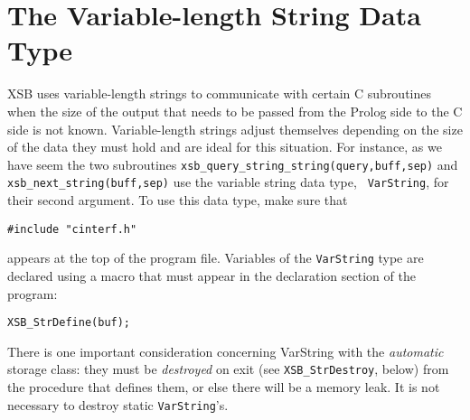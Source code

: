 %
%
%
%
%
%

\section{The Variable-length String Data Type}\label{sec-varstring}

 XSB uses variable-length strings to communicate with
certain C subroutines when the size of the output that needs to be passed
from the Prolog side to the C side is not known. Variable-length strings
adjust themselves depending on the size of the data they must hold and are
ideal for this situation. For instance, as we have seem the two subroutines
{\tt xsb\_query\_string\_string(query,buff,sep)} and {\tt
  xsb\_next\_string(buff,sep)} use the variable string data type, {\tt
  VarString}, for their second argument.  To use this data type, make sure
that
\begin{verbatim}
#include "cinterf.h"  
\end{verbatim}
appears at the top of the program file.  Variables of the {\tt VarString}
type are declared using a macro that must appear in the declaration section
of the program:
\begin{verbatim}
XSB_StrDefine(buf);  
\end{verbatim}
There is one important consideration concerning VarString with the
\emph{automatic} storage class: they must be
\emph{destroyed} on exit (see {\tt XSB\_StrDestroy}, below) from the procedure
that defines them, or else there will be a memory leak. 
It is not necessary to destroy static {\tt VarString}'s.

